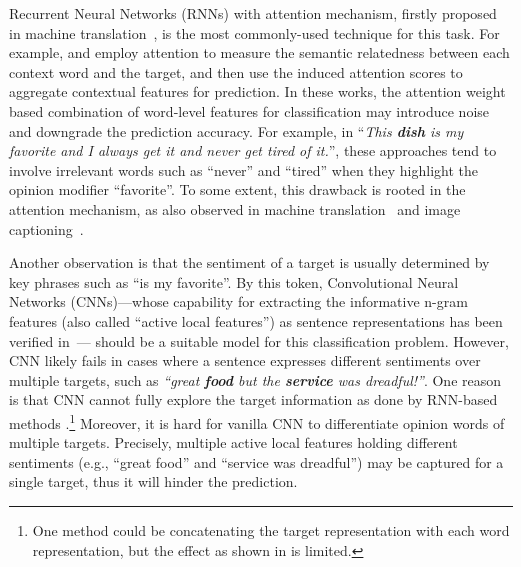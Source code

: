 \documentclass[11pt,a4paper]{article}
\begin{document}
Recurrent Neural Networks (RNNs) with attention mechanism, firstly proposed in machine translation~\cite{bahdanau2014neural}, is the most commonly-used technique for this task. For example, \citet{wang-EtAl:2016:EMNLP20163,tang-qin-liu:2016:EMNLP2016,yang2017attention,liu-zhang:2017:EACLshort,ma2017interactive} and \citet{chen-EtAl:2017:EMNLP20171} employ attention to measure the semantic relatedness between each context word and the target, and then use the induced attention scores to aggregate contextual features for prediction. 
In these works, the attention weight based combination of word-level features for classification may introduce noise and downgrade the prediction accuracy. For example, in ``\textit{This \textbf{dish} is my favorite and I always get it and never get tired of it.}'', these approaches tend to involve irrelevant words such as ``never'' and ``tired'' when they highlight the opinion modifier ``favorite''. To some extent, this drawback is rooted in the attention mechanism, as also observed in machine translation~\cite{luong-pham-manning:2015:EMNLP} and image captioning~\cite{xu2015show}.

Another observation is that the sentiment of a target is usually determined by key phrases such as ``is my favorite''. By this token, Convolutional Neural Networks (CNNs)---whose capability for extracting the informative n-gram features (also called ``active local features'') as sentence representations has been verified in~\cite{kim:2014:EMNLP2014,johnson2015semi}--- should be a suitable model for this classification problem. 
However, CNN likely fails in cases where a sentence expresses different sentiments over multiple targets, such as \textit{``great \textbf{food} but the \textbf{service} was dreadful!''}. One reason is that CNN cannot fully explore the target information as done by RNN-based methods \cite{tang-EtAl:2016:COLING3}.\footnote{One method could be concatenating the target representation with each word representation, but the effect as shown in \cite{wang-EtAl:2016:EMNLP20163} is limited.}  Moreover, it is hard for vanilla CNN to differentiate opinion words of multiple targets. Precisely, multiple active local features holding different sentiments (e.g., ``great food'' and ``service was dreadful'') may be captured for a single target, thus it will hinder the prediction. 
\end{document}
